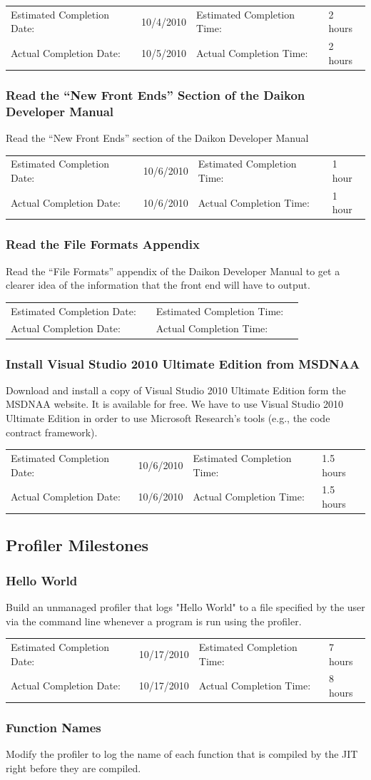 \documentclass{article}
\newcommand{\timetbl}[4]{\par\vspace{5mm}\begin{tabular}{ l l l l }
Estimated Completion Date: & #1 & Estimated Completion Time: & #2 \\
Actual Completion Date: & #3 & Actual Completion Time: & #4 \\
\end{tabular}}
\begin{document}
\timetbl{10/4/2010}{2 hours}{10/5/2010}{2 hours}

\subsubsection{Read the ``New Front Ends'' Section of the Daikon Developer Manual}
Read the ``New Front Ends'' section of the Daikon Developer Manual \cite{DaikonDeveloperManual:Online}

\timetbl{10/6/2010}{1 hour}{10/6/2010}{1 hour}

\subsubsection{Read the File Formats Appendix}
Read the ``File Formats'' appendix of the Daikon Developer Manual to get a clearer idea of the information that the front end will have to output.

\timetbl{}{}{}{}

\subsubsection{Install Visual Studio 2010 Ultimate Edition from MSDNAA}
Download and install a copy of Visual Studio 2010 Ultimate Edition form the MSDNAA website. It is available for free. We have to use Visual Studio 2010 Ultimate Edition in order to use Microsoft Research's tools (e.g., the code contract framework).

\timetbl{10/6/2010}{1.5 hours}{10/6/2010}{1.5 hours}

\subsection{Profiler Milestones}

\subsubsection{Hello World}
Build an unmanaged profiler that logs "Hello World" to a file specified by the user via the command line whenever a program is run using the profiler.

\timetbl{10/17/2010}{7 hours}{10/17/2010}{8 hours}

\subsubsection{Function Names}
Modify the profiler to log the name of each function that is compiled by the JIT right before they are compiled.
\end{document}
